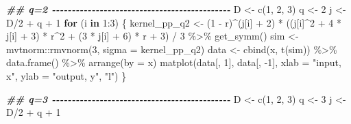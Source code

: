 \documentclass[
]{article}
\newenvironment{Shaded}{\begin{snugshade}}{\end{snugshade}}
\newcommand{\AttributeTok}[1]{\textcolor[rgb]{0.77,0.63,0.00}{#1}}
\newcommand{\ControlFlowTok}[1]{\textcolor[rgb]{0.13,0.29,0.53}{\textbf{#1}}}
\newcommand{\DecValTok}[1]{\textcolor[rgb]{0.00,0.00,0.81}{#1}}
\newcommand{\DocumentationTok}[1]{\textcolor[rgb]{0.56,0.35,0.01}{\textbf{\textit{#1}}}}
\newcommand{\FunctionTok}[1]{\textcolor[rgb]{0.00,0.00,0.00}{#1}}
\newcommand{\NormalTok}[1]{#1}
\newcommand{\OtherTok}[1]{\textcolor[rgb]{0.56,0.35,0.01}{#1}}
\newcommand{\SpecialCharTok}[1]{\textcolor[rgb]{0.00,0.00,0.00}{#1}}
\newcommand{\StringTok}[1]{\textcolor[rgb]{0.31,0.60,0.02}{#1}}
\begin{document}
\begin{Shaded}
\begin{Highlighting}[]
\DocumentationTok{\#\# q=2 {-}{-}{-}{-}{-}{-}{-}{-}{-}{-}{-}{-}{-}{-}{-}{-}{-}{-}{-}{-}{-}{-}{-}{-}{-}{-}{-}{-}{-}{-}{-}{-}{-}{-}{-}{-}{-}{-}{-}{-}{-}{-}{-}{-}{-}}
\NormalTok{D }\OtherTok{\textless{}{-}} \FunctionTok{c}\NormalTok{(}\DecValTok{1}\NormalTok{, }\DecValTok{2}\NormalTok{, }\DecValTok{3}\NormalTok{)}
\NormalTok{q }\OtherTok{\textless{}{-}} \DecValTok{2}
\NormalTok{j }\OtherTok{\textless{}{-}}\NormalTok{ D}\SpecialCharTok{/}\DecValTok{2} \SpecialCharTok{+}\NormalTok{ q }\SpecialCharTok{+} \DecValTok{1}
\ControlFlowTok{for}\NormalTok{ (i }\ControlFlowTok{in} \DecValTok{1}\SpecialCharTok{:}\DecValTok{3}\NormalTok{) \{}
\NormalTok{  kernel\_pp\_q2 }\OtherTok{\textless{}{-}}\NormalTok{ (}\DecValTok{1} \SpecialCharTok{{-}}\NormalTok{ r)}\SpecialCharTok{\^{}}\NormalTok{(j[i] }\SpecialCharTok{+} \DecValTok{2}\NormalTok{) }\SpecialCharTok{*} 
\NormalTok{    ((j[i]}\SpecialCharTok{\^{}}\DecValTok{2} \SpecialCharTok{+} \DecValTok{4} \SpecialCharTok{*}\NormalTok{ j[i] }\SpecialCharTok{+} \DecValTok{3}\NormalTok{) }\SpecialCharTok{*}\NormalTok{ r}\SpecialCharTok{\^{}}\DecValTok{2} \SpecialCharTok{+} 
\NormalTok{       (}\DecValTok{3} \SpecialCharTok{*}\NormalTok{ j[i] }\SpecialCharTok{+} \DecValTok{6}\NormalTok{) }\SpecialCharTok{*}\NormalTok{ r }\SpecialCharTok{+} \DecValTok{3}\NormalTok{) }\SpecialCharTok{/} \DecValTok{3} \SpecialCharTok{\%\textgreater{}\%} \FunctionTok{get\_symm}\NormalTok{()}
\NormalTok{  sim }\OtherTok{\textless{}{-}}\NormalTok{ mvtnorm}\SpecialCharTok{::}\FunctionTok{rmvnorm}\NormalTok{(}\DecValTok{3}\NormalTok{, }\AttributeTok{sigma =}\NormalTok{ kernel\_pp\_q2)}
\NormalTok{  data }\OtherTok{\textless{}{-}} \FunctionTok{cbind}\NormalTok{(x, }\FunctionTok{t}\NormalTok{(sim)) }\SpecialCharTok{\%\textgreater{}\%} 
    \FunctionTok{data.frame}\NormalTok{() }\SpecialCharTok{\%\textgreater{}\%}
    \FunctionTok{arrange}\NormalTok{(}\AttributeTok{by =}\NormalTok{ x)}
  \FunctionTok{matplot}\NormalTok{(data[, }\DecValTok{1}\NormalTok{], data[, }\SpecialCharTok{{-}}\DecValTok{1}\NormalTok{], }\AttributeTok{xlab =} \StringTok{"input, x"}\NormalTok{, }\AttributeTok{ylab =} \StringTok{"output, y"}\NormalTok{, }\StringTok{"l"}\NormalTok{)}
\NormalTok{\}}

\DocumentationTok{\#\# q=3 {-}{-}{-}{-}{-}{-}{-}{-}{-}{-}{-}{-}{-}{-}{-}{-}{-}{-}{-}{-}{-}{-}{-}{-}{-}{-}{-}{-}{-}{-}{-}{-}{-}{-}{-}{-}{-}{-}{-}{-}{-}{-}{-}{-}{-}}
\NormalTok{D }\OtherTok{\textless{}{-}} \FunctionTok{c}\NormalTok{(}\DecValTok{1}\NormalTok{, }\DecValTok{2}\NormalTok{, }\DecValTok{3}\NormalTok{)}
\NormalTok{q }\OtherTok{\textless{}{-}} \DecValTok{3}
\NormalTok{j }\OtherTok{\textless{}{-}}\NormalTok{ D}\SpecialCharTok{/}\DecValTok{2} \SpecialCharTok{+}\NormalTok{ q }\SpecialCharTok{+} \DecValTok{1}


\end{Highlighting}
\end{Shaded}
\end{document}
